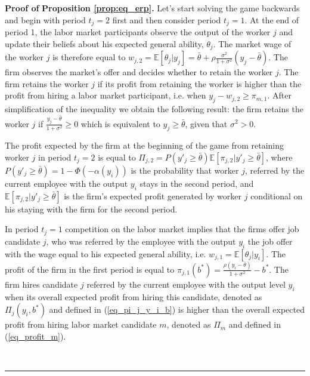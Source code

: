 \documentclass[12pt]{article}
\newenvironment{proof}[1][Proof of]{\noindent\textbf{#1} }{\ \rule{0.5em}{0.5em}}
\begin{document}
\begin{proof}
    \textbf{Proposition \ref{prop:eq_erp}.}
    Let's start solving the game backwards and begin with period $t_j = 2$ first and then consider period $t_j = 1$. At the end of period 1, the labor market participants observe the output of the worker $j$ and update their beliefs about his expected general ability, $\theta_j$. The market wage of the worker $j$ is therefore equal to $w_{j,2} = \mathbb{E}[\theta_j | y_j] = \bar{\theta} + \rho\frac{\sigma^2}{1+\sigma^2}(y_j - \bar{\theta})$. The firm observes the market's offer and decides whether to retain the worker $j$. The firm retains the worker $j$ if its profit from retaining the worker is higher than the profit from hiring a labor market participant, i.e. when $y_j - w_{j,2} \geq \pi_{m,1}$. After simplification of the inequality we obtain the following result: the firm retains the worker $j$ if $\frac{y_j - \bar{\theta}}{1+\sigma^2} \geq 0$ which is equivalent to $y_j \geq \bar{\theta}$, given that $\sigma^2 >0$. 
    
    The profit expected by the firm at the beginning of the game from retaining worker $j$ in period $t_j = 2$ is equal to $\Pi_{j,2} = P(y'_j \geq \bar{\theta})\mathbb{E}[\pi_{j,2}|y'_j \geq \bar{\theta}]$, where $P(y'_j \geq \bar{\theta}) = 1-\Phi(-\alpha(y_i))$ is the probability that worker $j$, referred by the current employee with the output $y_i$ stays in the second period, and $\mathbb{E}[\pi_{j,2}|y'_j \geq \bar{\theta}]$ is the firm's expected profit generated by worker $j$ conditional on his staying with the firm for the second period.  
    
    In period $t_j = 1$ competition on the labor market implies that the firms offer job candidate $j$, who was referred by the employee with the output $y_i$ the job offer with the wage equal to his expected general ability, i.e. $w_{j,1} = \mathbb{E}[\theta_j| y_i]$. The profit of the firm in the first period is equal to $\pi_{j,1}(b^*) = \frac{\rho(y_i - \bar{\theta})}{1+\sigma^2}-b^*$. The firm hires candidate $j$ referred by the current employee with the output level $y_i$ when its overall expected profit from hiring this candidate, denoted as $\Pi_j(y_i, b^*)$ and defined in (\ref{eq_pi_j_y_i_b}) is higher than the overall expected profit from hiring labor market candidate $m$, denoted as $\Pi_m$ and defined in (\ref{eq_profit_m}).


\end{proof}
\end{document}
